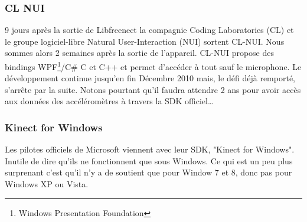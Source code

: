 \subsubsection{CL NUI}
9 jours après la sortie de Libfreenect la compagnie Coding Laboratories 
(CL) et le groupe logiciel-libre
Natural User-Interaction (NUI) sortent CL-NUI\cite{clnui}. Nous sommes alors 2 semaines 
après la sortie de l'appareil. CL-NUI propose des bindings 
WPF\footnote{Windows Presentation Foundation}/C\# C et C++ et permet d'accéder 
à tout sauf le microphone. Le développement continue jusqu'en fin Décembre 2010 
mais,
le défi déjà remporté, s'arrête par la suite. Notons pourtant qu'il faudra 
attendre 2 ans pour avoir accès aux données des accéléromètres à travers la 
SDK officiel\ldots
\subsubsection{Kinect for Windows}  
Les pilotes officiels de Microsoft viennent avec leur SDK, "Kinect for 
Windows". Inutile de dire
qu'ils ne fonctionnent que sous Windows. Ce qui est un peu plus surprenant 
c'est qu'il n'y a de soutient que pour Window 7 et 8, donc pas pour Windows XP 
ou Vista.
